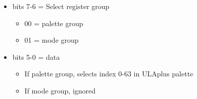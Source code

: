 \begin{itemize}
\item[] bits 7-6 = Select register group
\begin{itemize}
\item 00 = palette group
\item 01 = mode group
\end{itemize}
\item[] bits 5-0 = data
\begin{itemize}
\item[] If palette group, selects index 0-63 in ULAplus palette
\item[] If mode group, ignored
\end{itemize}
\end{itemize}

